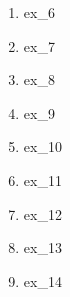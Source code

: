 \begin{enumerate}
\item {ex_6}
\item {ex_7}
\item {ex_8}
\item {ex_9}
\item {ex_10}
\item {ex_11}
\item {ex_12}
\item {ex_13}
\item {ex_14}
\end{enumerate}